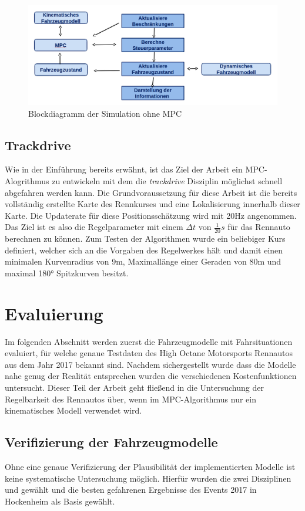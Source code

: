 \documentclass{like}
\begin{document}
\begin{figure}[ht!]
	\centering
	\includegraphics[width=350pt]{Abbildungen/sim_for_loop.png}
	\caption{Blockdiagramm der Simulation ohne MPC}
	\label{fig:block_diagram_sim}
\end{figure}


\section{Trackdrive}
Wie in der Einführung bereits erwähnt, ist das Ziel der Arbeit ein \ac{MPC}-Alogrithmus zu entwickeln mit dem die \emph{trackdrive} Disziplin möglichst schnell abgefahren werden kann. Die Grundvoraussetzung für diese Arbeit ist die bereits vollständig erstellte Karte des Rennkurses und eine Lokalisierung innerhalb dieser Karte. Die Updaterate für diese Positionsschätzung wird mit 20Hz angenommen. Das Ziel ist es also die Regelparameter mit einem $\Delta t$ von $\frac{1}{20} s$ für das Rennauto berechnen zu können.  Zum Testen der Algorithmen wurde ein beliebiger Kurs definiert, welcher sich an die Vorgaben des Regelwerkes hält und damit einen minimalen Kurvenradius von 9m, Maximallänge einer Geraden von 80m und maximal 180° Spitzkurven besitzt.

\chapter{Evaluierung}
Im folgenden Abschnitt werden zuerst die Fahrzeugmodelle mit Fahrsituationen evaluiert, für welche genaue Testdaten des High Octane Motorsports Rennautos aus dem Jahr 2017 bekannt sind. 
Nachdem sichergestellt wurde dass die Modelle nahe genug der Realität entsprechen wurden die verschiedenen Kostenfunktionen untersucht. Dieser Teil der Arbeit geht fließend in die Untersuchung der Regelbarkeit des Rennautos über, wenn im MPC-Algorithmus nur ein kinematisches Modell verwendet wird.

\section{Verifizierung der Fahrzeugmodelle}
Ohne eine genaue Verifizierung der Plausibilität der implementierten Modelle ist keine systematische Untersuchung möglich. Hierfür wurden die zwei Disziplinen  und  gewählt und die besten gefahrenen Ergebnisse des Events 2017 in Hockenheim als Basis gewählt.
\end{document}
